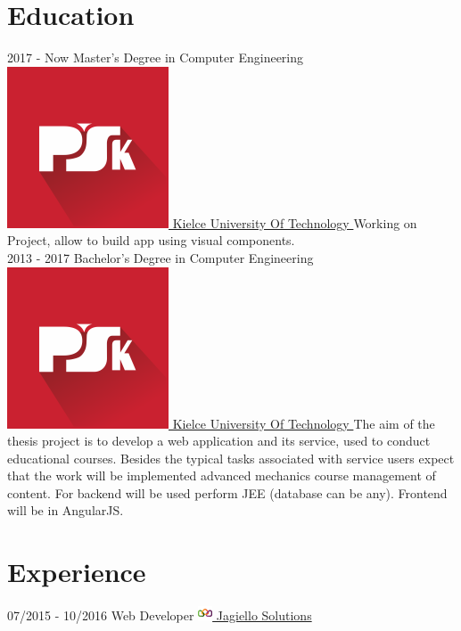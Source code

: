 \documentclass[]{friggeri-cv}
\begin{document}
\section{Education}
\begin{entrylist}
  \entry
    {2017 - Now}
    {Master's Degree in Computer Engineering}
	{\href{http://tu.kielce.pl/}{ \includegraphics[scale=0.25]{img/psk_fb_logo_180px.png} Kielce University Of Technology } }
    {Working on Project, allow to build app using visual components.\\}
  \entry
    {2013 - 2017}
    {Bachelor's Degree in Computer Engineering}
   	{\href{http://tu.kielce.pl/}{\includegraphics[scale=0.25]{img/psk_fb_logo_180px.png} Kielce University Of Technology } }
	{The aim of the thesis project is to develop a web application and its service, used to conduct educational courses. Besides the typical tasks associated with service users expect that the work will be implemented advanced mechanics course management of content. For backend will be used perform JEE (database can be any). Frontend will be in AngularJS.\\}
\end{entrylist}


\section{Experience}
\begin{entrylist}
  \entry
    {07/2015 -  10/2016}
    {  Web Developer}
    {\href{http://jagiello.solutions/}{ \includegraphics[]{img/favicon.png} Jagiello Solutions } }
    {  }  
\end{entrylist}
\end{document}
